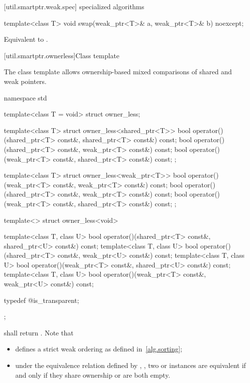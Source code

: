 [util.smartptr.weak.spec]{ specialized algorithms}

%
%
\begin{itemdecl}
template<class T> void swap(weak_ptr<T>& a, weak_ptr<T>& b) noexcept;
\end{itemdecl}

\begin{itemdescr}
\pnum\effects  Equivalent to .
\end{itemdescr}

[util.smartptr.ownerless]{Class template }

\pnum
The class template  allows ownership-based mixed comparisons of shared
and weak pointers.

\begin{codeblock}
namespace std {
  template<class T = void> struct owner_less;

  template<class T> struct owner_less<shared_ptr<T>> {
    bool operator()(shared_ptr<T> const&, shared_ptr<T> const&) const;
    bool operator()(shared_ptr<T> const&, weak_ptr<T> const&) const;
    bool operator()(weak_ptr<T> const&, shared_ptr<T> const&) const;
  };

  template<class T> struct owner_less<weak_ptr<T>> {
    bool operator()(weak_ptr<T> const&, weak_ptr<T> const&) const;
    bool operator()(shared_ptr<T> const&, weak_ptr<T> const&) const;
    bool operator()(weak_ptr<T> const&, shared_ptr<T> const&) const;
  };

  template<> struct owner_less<void> {
    template<class T, class U>
      bool operator()(shared_ptr<T> const&, shared_ptr<U> const&) const;
    template<class T, class U>
      bool operator()(shared_ptr<T> const&, weak_ptr<U> const&) const;
    template<class T, class U>
      bool operator()(weak_ptr<T> const&, shared_ptr<U> const&) const;
    template<class T, class U>
      bool operator()(weak_ptr<T> const&, weak_ptr<U> const&) const;

    typedef @\unspec@ is_transparent;
  };
}
\end{codeblock}

\pnum {} shall return . \enternote
Note that

\begin{itemize}
\item {} defines a strict weak ordering as defined in~\ref{alg.sorting};

\item under the equivalence relation defined by ,
, two  or
 instances are equivalent if and only if they share ownership or are
both empty.
\end{itemize} \exitnote

